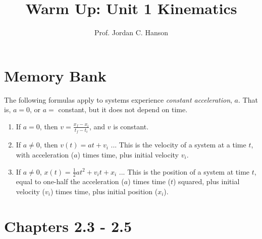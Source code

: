 \documentclass{article}
\begin{document}
\title{Warm Up: Unit 1 Kinematics}
\author{Prof. Jordan C. Hanson}
\maketitle

\section{Memory Bank}
The following formulas apply to systems experience \textit{constant acceleration}, $a$.  That is, $a = 0$, or $a = $ constant, but it does not depend on time.
\begin{enumerate}
\item If $a = 0$, then $v = \frac{x_f - x_i}{t_f - t_i}$, and $v$ is constant.
\item If $a \neq 0$, then $v(t) = a t + v_i$ ... This is the velocity of a system at a time $t$, with acceleration ($a$) times time, plus initial velocity $v_i$.
\item If $a \neq 0$, $x(t) = \frac{1}{2}a t^2 + v_i t + x_i$ ... This is the position of a system at time $t$, equal to one-half the acceleration ($a$) times time ($t$) squared, plus initial velocity ($v_i$) times time, plus initial position ($x_i$).
\end{enumerate}

\section{Chapters 2.3 - 2.5}
\end{document}

